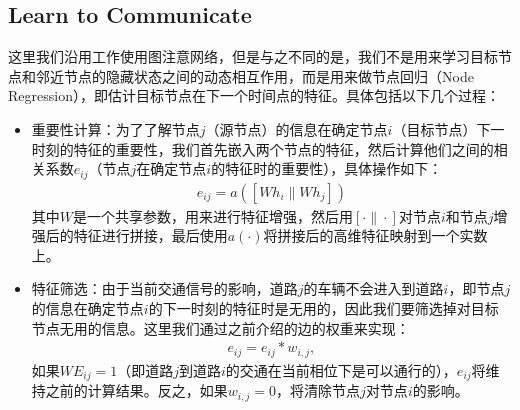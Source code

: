 \subsection{Learn to Communicate}
这里我们沿用工作使用图注意网络，但是与之不同的是，我们不是用来学习目标节点和邻近节点的隐藏状态之间的动态相互作用，而是用来做节点回归（Node Regression），即估计目标节点在下一个时间点的特征。具体包括以下几个过程：
\begin{itemize}
  \item 重要性计算：为了了解节点$j$（源节点）的信息在确定节点$i$（目标节点）下一时刻的特征的重要性，我们首先嵌入两个节点的特征，然后计算他们之间的相关系数$e_{i j}$（节点$j$在确定节点$i$的特征时的重要性），具体操作如下：
  \begin{align}
    e_{i j}=a\left(\left[W h_{i} \| W h_{j}\right]\right)
  \end{align}
  其中$W$是一个共享参数，用来进行特征增强，然后用$[\cdot \| \cdot]$对节点$i$和节点$j$增强后的特征进行拼接，最后使用$a(\cdot)$将拼接后的高维特征映射到一个实数上。
  
  \item 特征筛选：由于当前交通信号的影响，道路$j$的车辆不会进入到道路$i$，即节点$j$的信息在确定节点$i$的下一时刻的特征时是无用的，因此我们要筛选掉对目标节点无用的信息。这里我们通过之前介绍的边的权重来实现：
  \begin{align}
    \label{eq:mul_phase}
    e_{i j} = e_{i j} * w_{i,j},
  \end{align}
  如果$WE_{i j} = 1$（即道路$j$到道路$i$的交通在当前相位下是可以通行的），$e_{ij}$将维持之前的计算结果。反之，如果$w_{i,j}=0$，将清除节点$j$对节点$i$的影响。
  

\end{itemize}
